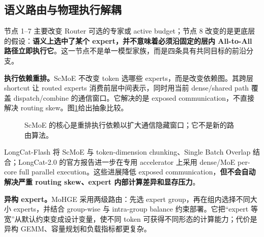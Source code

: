 \documentclass[10pt,a4paper,fontset=none]{ctexart}
\newcommand{\term}[1]{\textbf{#1}}
\begin{document}
\subsection{语义路由与物理执行解耦}

节点 1--7 主要改变 Router 可选的专家或 active budget；节点 8 改变的是更底层的假设：\term{语义上选中了某个 expert，并不意味着必须沿固定的层内 All-to-All 路径立即执行它}。这一节点不是单一模型家族，而是四条具有共同目标的前沿分支。

\textbf{执行依赖重排。}ScMoE 不改变 token 选哪些 experts，而是改变依赖图。其跨层 shortcut 让 routed experts 消费前层中间表示，同时用当前 dense/shared path 覆盖 dispatch/combine 的通信窗口\cite{cai2024scmoe}。它解决的是 exposed communication，不直接解决 routing skew。图\ref{fig:scmoe}给出抽象比较。

\begin{figure}[htbp]
\centering
{}
\caption{ScMoE 的核心是重排执行依赖以扩大通信隐藏窗口；它不是新的路由算法。}
\label{fig:scmoe}
\end{figure}

LongCat-Flash 将 ScMoE 与 token-dimension chunking、Single Batch Overlap 结合；LongCat-2.0 的官方报告进一步在专用 accelerator 上采用 dense/MoE per-core full parallel execution\cite{longcat2}。这些进展降低 exposed communication，\textbf{但不会自动解决严重 routing skew、expert 内部计算差异和显存压力}。

\textbf{异构 expert。}MoHGE 采用两级路由：先选 expert group，再在组内选择不同大小 experts，并结合 group-wise 与 intra-group balance 约束部署\cite{mohge2026}。它把“expert 等宽”从默认约束变成设计变量，使不同 token 可获得不同形态的计算能力；代价是异构 GEMM、容量规划和负载指标都更复杂。
\end{document}
